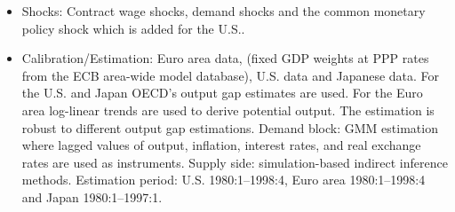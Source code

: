 \documentclass[11pt,a4paper]{article}
\begin{document}
\begin{itemize}
		\item Shocks: Contract wage shocks, demand shocks and the common monetary policy shock which is added for the U.S..
		\item Calibration/Estimation: Euro area data, (fixed GDP weights at PPP rates from the ECB area-wide model database), U.S. data and Japanese data. For the U.S. and Japan OECD's output gap estimates are used. For the Euro area log-linear trends are used to derive potential output. The estimation is robust to different output gap estimations.
		Demand block: GMM estimation where lagged values of output, inflation, interest rates, and real exchange rates are used as instruments. Supply side: simulation-based indirect inference methods. Estimation period: U.S. 1980:1--1998:4, Euro area 1980:1--1998:4 and Japan 1980:1--1997:1.
		

\end{itemize}
\end{document}

